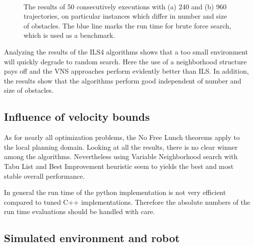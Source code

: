 \begin{figure}[thb]
   \myfloatalign
    \subfloat[]
    {  
       \def\svgwidth{\textwidth}
       
    }\\
    \subfloat[]
    {  
       \def\svgwidth{\textwidth}
       
    }
    \caption[Experiment: Trajectory size comparison]{The results of 50 consecutively executions with (a) 240 and (b) 960 trajectories, on particular instances which differ in number and size of obstacles. The blue line marks the run time for brute force search, which is used as a benchmark.}  
     \label{fig:fig_special}
\end{figure}
   
Analyzing the results of the ILS4 algorithms shows that a too small environment will quickly degrade to random search. 
Here the use of a neighborhood structure pays off and the VNS approaches perform evidently better than ILS. 
In addition, the results show that the algorithms perform good independent of number and size of obstacles.

\subsection{Influence of velocity bounds}

As for nearly all optimization problems, the No Free Lunch theorems \cite{wolpert1997no} apply to the local planning domain. 
Looking at all the results, there is no clear winner among the algorithms. 
Nevertheless using Variable Neighborhood search with Tabu List and Best Improvement heuristic seem to yields the best and most stable overall performance. 

In general the run time of the python implementation is not very efficient compared to tuned C++ implementations. 
Therefore the absolute numbers of the run time evaluations should be handled with care. 

\subsection{Simulated environment and robot}
